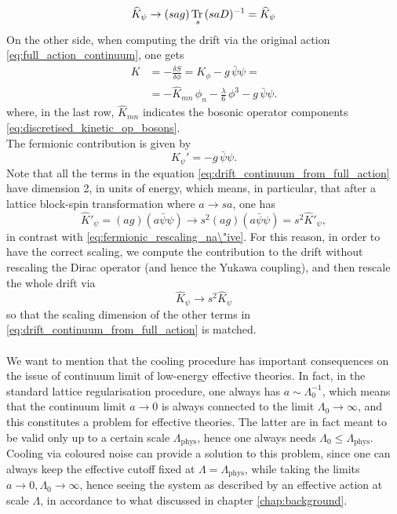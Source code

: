\begin{equation}
    \widehat{K}_{\psi} \to  (sag) \, \underset{s}{\operatorname{\text{Tr} \,}}{(saD)^{-1}} = \widehat{K}_{\psi}
    \label{eq:fermionic_rescaling_na\"ive}
\end{equation}
On the other side, when computing the drift via the original action \eqref{eq:full_action_continuum}, one gets
\begin{equation}
    \begin{aligned}
        K &= - \frac{\delta S}{\delta \phi} = K_\phi - g \, \bar\psi\psi = \\
        &= - \hat K_{mn} \, \phi_n - \frac{\lambda}{6} \, \phi^3 - g \, \bar\psi\psi.
    \end{aligned}
    \label{eq:drift_continuum_from_full_action}
\end{equation}
where, in the last row, $\widehat{K}_{mn}$ indicates the bosonic operator components \eqref{eq:discretised_kinetic_op_bosons}.\\
The fermionic contribution is given by
\begin{equation*}
    K_{\psi}' = - g \, \bar\psi\psi.
\end{equation*}
Note that all the terms in the equation \eqref{eq:drift_continuum_from_full_action} have dimension 2, in units of energy, which means, in particular, that after a lattice block-spin transformation where $a \to sa$, one has
\begin{equation}
    \widehat{K}'_\psi = (ag) (a\bar\psi \psi) \to s^2 (ag) (a\bar\psi \psi) = s^2 \widehat{K}'_\psi,
    \label{eq:rescaling_blinear}
\end{equation}
in contrast with \eqref{eq:fermionic_rescaling_na\"ive}. For this reason, in order to have the correct scaling, we compute the contribution to the drift without rescaling the Dirac operator (and hence the Yukawa coupling), and then rescale the whole drift via 
\begin{equation*}
    \widehat{K}_\psi \to s^2 \widehat{K}_\psi
\end{equation*}
so that the scaling dimension of the other terms in \eqref{eq:drift_continuum_from_full_action} is matched. \\~\\
We want to mention that the cooling procedure has important consequences on the issue of continuum limit of low-energy effective theories. In fact, in the standard lattice regularisation procedure, one always has $a \sim \Lambda_0^{-1}$, which means that the continuum limit $a \to 0$ is always connected to the limit $\Lambda_0 \to \infty$, and this constitutes a problem for effective theories. The latter are in fact meant to be valid only up to a certain scale $\Lambda_\text{phys}$, hence one always needs $\Lambda_0 \leq \Lambda_\text{phys}$. Cooling via coloured noise can provide a solution to this problem, since one can always keep the effective cutoff fixed at $\Lambda = \Lambda_\text{phys}$, while taking the limits $a \to 0, \Lambda_0 \to \infty$, hence seeing the system as described by an effective action at scale $\Lambda$, in accordance to what discussed in chapter \ref{chap:background}.

